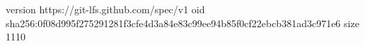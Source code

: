 version https://git-lfs.github.com/spec/v1
oid sha256:0f08d995f275291281f3cfe4d3a84e83c99ee94b85f0cf22ebcb381ad3c971e6
size 1110
